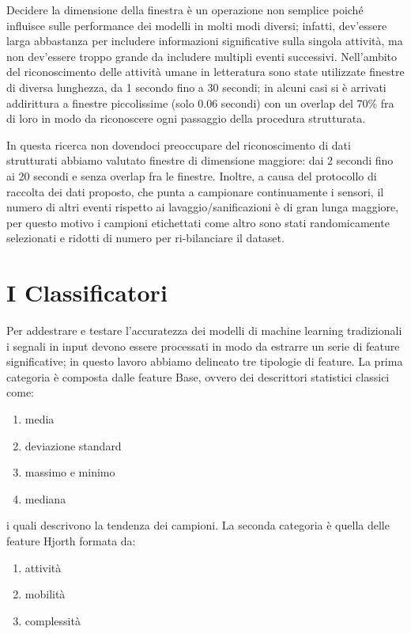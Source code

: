 Decidere la dimensione della finestra è un operazione non semplice poiché influisce sulle performance dei modelli in molti modi diversi; infatti, dev'essere larga abbastanza per includere informazioni significative sulla singola attività, ma non dev'essere troppo grande da includere multipli eventi successivi. Nell'ambito del riconoscimento delle attività umane in letteratura sono state utilizzate finestre di diversa lunghezza, da 1 secondo fino a 30 secondi\cite{cheng2010active}\cite{hassan2018robust}; in alcuni casi si è arrivati addirittura a finestre piccolissime (solo 0.06 secondi) con un overlap del 70\% fra di loro in modo da riconoscere ogni passaggio della procedura strutturata.

In questa ricerca non dovendoci preoccupare del riconoscimento di dati strutturati abbiamo valutato finestre di dimensione maggiore: dai 2 secondi fino ai 20 secondi e senza overlap fra le finestre. Inoltre, a causa del protocollo di raccolta dei dati proposto, che punta a campionare continuamente i sensori, il numero di altri eventi rispetto ai lavaggio/sanificazioni è di gran lunga maggiore, per questo motivo i campioni etichettati come altro sono stati randomicamente selezionati e ridotti di numero per ri-bilanciare il dataset.

\section{I Classificatori}
\label{sec:classifiers}

Per addestrare e testare l'accuratezza dei modelli di machine learning tradizionali i segnali in input devono essere processati in modo da estrarre un serie di feature significative; in questo lavoro abbiamo delineato tre tipologie di feature. La prima categoria è composta dalle feature Base, ovvero dei descrittori statistici classici come:

\begin{enumerate}
    \item media
    \item deviazione standard
    \item massimo e minimo
    \item mediana
\end{enumerate}

i quali descrivono la tendenza dei campioni. La seconda categoria è quella delle feature Hjorth formata da:

\begin{enumerate}
    \item attività
    \item mobilità
    \item complessità
\end{enumerate}

